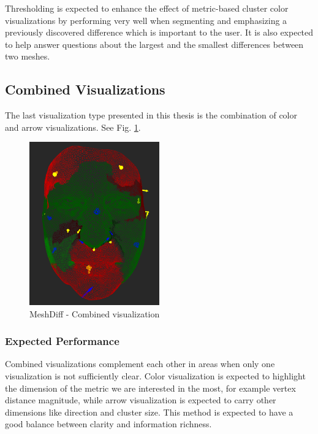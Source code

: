 Thresholding is expected to enhance the effect of metric-based cluster color visualizations by performing very well when segmenting and emphasizing a previously discovered difference which is important to the user. It is also expected to help answer questions about the largest and the smallest differences between two meshes.
\subsection{Combined Visualizations}
\label{subsec:analysis-visualizations-combined}

The last visualization type presented in this thesis is the combination of color and arrow visualizations. See Fig. \ref{fig:meshdiff-combination}.

\begin{figure}[h]
\centering
\includegraphics[width=0.5\textwidth]{./img/meshdiff-combination.PNG}
\caption[MeshDiff - Combined visualization]{MeshDiff - Combined visualization}
\label{fig:meshdiff-combination}
\end{figure}

\subsubsection{Expected Performance}

Combined visualizations complement each other in areas when only one visualization is not sufficiently clear. Color visualization is expected to highlight the dimension of the metric we are interested in the most, for example vertex distance magnitude, while arrow visualization is expected to carry other dimensions like direction and cluster size. This method is expected to have a good balance between clarity and information richness.
